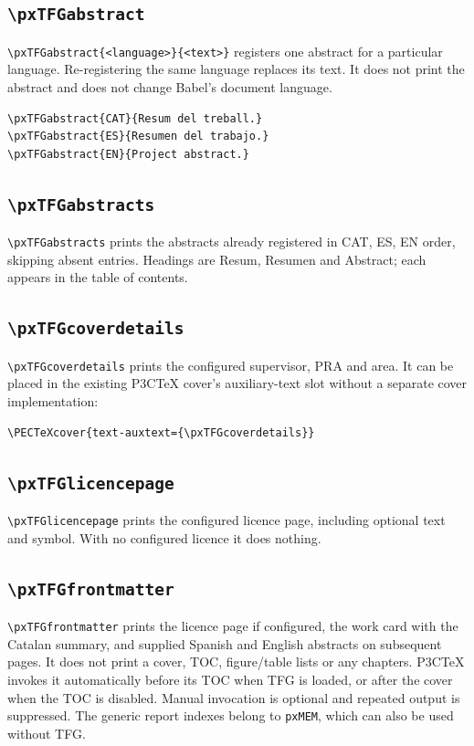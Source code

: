 \documentclass[11pt,a4paper]{article}
\begin{document}
\subsection{\texttt{\textbackslash pxTFGabstract}}
\verb+\pxTFGabstract{<language>}{<text>}+ registers one abstract for
a particular language. Re-registering the same language replaces its text.
It does not print the abstract and does not change Babel's document language.
\begin{verbatim}
\pxTFGabstract{CAT}{Resum del treball.}
\pxTFGabstract{ES}{Resumen del trabajo.}
\pxTFGabstract{EN}{Project abstract.}
\end{verbatim}

\subsection{\texttt{\textbackslash pxTFGabstracts}}
\verb|\pxTFGabstracts| prints the abstracts already registered in
CAT, ES, EN order, skipping absent entries. Headings are Resum,
Resumen and Abstract; each appears in the table of contents.

\subsection{\texttt{\textbackslash pxTFGcoverdetails}}
\verb|\pxTFGcoverdetails| prints the configured supervisor, PRA and
area. It can be placed in the existing P3CTeX cover's auxiliary-text
slot without a separate cover implementation:
\begin{verbatim}
\PECTeXcover{text-auxtext={\pxTFGcoverdetails}}
\end{verbatim}

\subsection{\texttt{\textbackslash pxTFGlicencepage}}
\verb|\pxTFGlicencepage| prints the configured licence page, including
optional text and symbol. With no configured licence it does nothing.

\subsection{\texttt{\textbackslash pxTFGfrontmatter}}
\verb|\pxTFGfrontmatter| prints the licence page if configured, the
work card with the Catalan summary, and supplied Spanish and English
abstracts on subsequent pages. It does not print a cover, TOC,
figure/table lists or any chapters. P3CTeX invokes it automatically
before its TOC when TFG is loaded, or after the cover when the TOC is
disabled. Manual invocation is optional and repeated output is suppressed.
The generic report indexes belong to \texttt{pxMEM}, which can also be
used without TFG.
\end{document}
